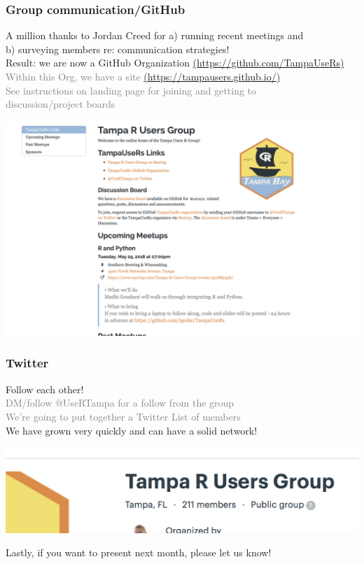 \documentclass{beamer}
\newcommand{\si}[1]{\hspace{.5cm} \textcolor{gray} {#1}\\}
\newcommand{\sicont}[1]{\hspace{1cm} \textcolor{gray} {#1}\\}
\begin{document}
{\begin{frame}[t]
\frametitle{Group communication/GitHub}
A million thanks to Jordan Creed for a) running recent meetings and \\
\hspace{.5cm} b) surveying members re: communication strategies!\\
\vspace{.2cm}
Result: we are now a GitHub Organization {\tiny\href{https://github.com/TampaUseRs}{(https://github.com/TampaUseRs)}}\\
\si{Within this Org, we have a site {\tiny\href{https://tampausers.github.io/}{(https://tampausers.github.io/)}}}
\si{See instructions on landing page for joining and getting to}
\sicont{discussion/project boards}
\begin{center}
\includegraphics[scale=.25, trim=0 0 0 0]{figures/webshot.png}
\end{center}
\end{frame}

\begin{frame}[t]
\frametitle{Twitter}
Follow each other! \\
\si{DM/follow @UseRTampa for a follow from the group}
\si{We're going to put together a Twitter List of members}
\vspace{.2cm}
We have grown very quickly and can have a solid network!\\
\begin{center}
\includegraphics[scale=.25, trim=0 0 0 0]{figures/members.png}
\end{center}
\vspace{.2cm}
Lastly, if you want to present next month, please let us know!
\end{frame}
}
\end{document}
